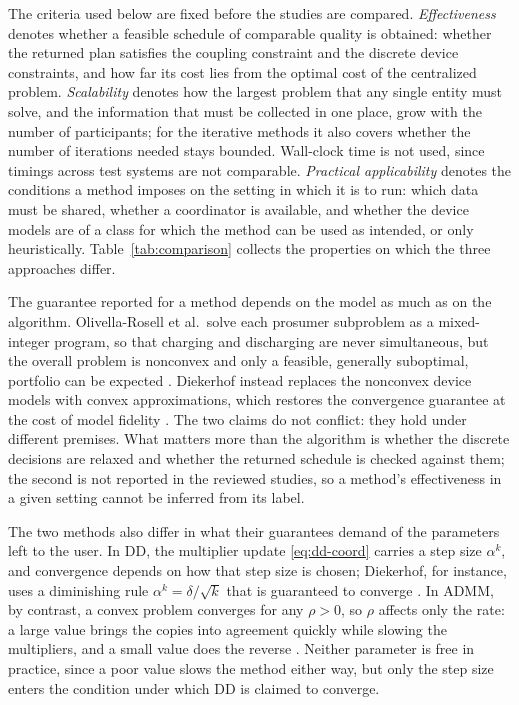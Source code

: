 \documentclass[conference]{IEEEtran}
\begin{document}
The criteria used below are fixed before the studies are compared. \emph{Effectiveness} denotes whether a feasible schedule of comparable quality is obtained: whether the returned plan satisfies the coupling constraint and the discrete device constraints, and how far its cost lies from the optimal cost of the centralized problem. \emph{Scalability} denotes how the largest problem that any single entity must solve, and the information that must be collected in one place, grow with the number of participants; for the iterative methods it also covers whether the number of iterations needed stays bounded. Wall-clock time is not used, since timings across test systems are not comparable. \emph{Practical applicability} denotes the conditions a method imposes on the setting in which it is to run: which data must be shared, whether a coordinator is available, and whether the device models are of a class for which the method can be used as intended, or only heuristically. Table~\ref{tab:comparison} collects the properties on which the three approaches differ.

The guarantee reported for a method depends on the model as much as on the algorithm. Olivella-Rosell et al.\ solve each prosumer subproblem as a mixed-integer program, so that charging and discharging are never simultaneous, but the overall problem is nonconvex and only a feasible, generally suboptimal, portfolio can be expected \cite{OlivellaRosell2020}. Diekerhof instead replaces the nonconvex device models with convex approximations, which restores the convergence guarantee at the cost of model fidelity \cite{Diekerhof2018}. The two claims do not conflict: they hold under different premises. What matters more than the algorithm is whether the discrete decisions are relaxed and whether the returned schedule is checked against them; the second is not reported in the reviewed studies, so a method's effectiveness in a given setting cannot be inferred from its label.

The two methods also differ in what their guarantees demand of the parameters left to the user. In DD, the multiplier update \eqref{eq:dd-coord} carries a step size $\alpha^k$, and convergence depends on how that step size is chosen; Diekerhof, for instance, uses a diminishing rule $\alpha^k=\delta/\sqrt{k}$ that is guaranteed to converge \cite{Diekerhof2018}. In ADMM, by contrast, a convex problem converges for any $\rho>0$, so $\rho$ affects only the rate: a large value brings the copies into agreement quickly while slowing the multipliers, and a small value does the reverse \cite{Diekerhof2018}. Neither parameter is free in practice, since a poor value slows the method either way, but only the step size enters the condition under which DD is claimed to converge.
\end{document}

